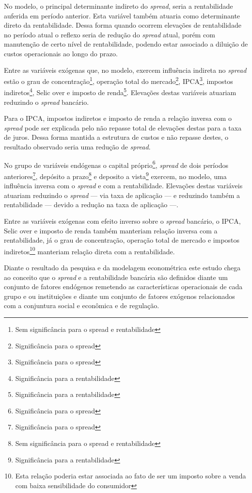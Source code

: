 \documentclass[
  12pt,
  12pt,
  openright,
  oneside,
  a4paper,
  chapter=TITLE,
  section=TITLE,
  subsection=TITLE,
  subsubsection=TITLE,
  english,
  portugues,
  sumario=tradicional]{abntex2}
\begin{document}
No modelo, o principal determinante indireto do \emph{spread}, seria a rentabilidade auferida em período anterior. Esta variável também atuaria como determinante direto da rentabilidade. Dessa forma quando ocorrem elevações de rentabilidade no período atual o reflexo seria de redução do \emph{spread} atual, porém com manutenção de certo nível de rentabilidade, podendo estar associado a diluição de custos operacionais ao longo do prazo.

Entre as variáveis exógenas que, no modelo, exercem influência indireta no \emph{spread} estão o grau de concentração\footnote{Sem significância para o spread e rentabilidade}, operação total do mercado\footnote{Significância para o spread}, IPCA\footnote{Significância para o spread}, impostos indiretos\footnote{Significância para a rentabilidade}, Selic over e imposto de renda\footnote{Significância para a rentabilidade}. Elevações destas variáveis atuariam reduzindo o \emph{spread} bancário.

Para o IPCA, impostos indiretos e imposto de renda a relação inversa com o \emph{spread} pode ser explicada pelo não repasse total de elevações destas para a taxa de juros. Dessa forma mantida a estrutura de custos e não repasse destes, o resultado observado seria uma redução de \emph{spread}.

No grupo de variáveis endógenas o capital próprio\footnote{Significância para o spread}, \emph{spread} de dois períodos anteriores\footnote{Significância para o spread}, depósito a prazo\footnote{Sem significância para o spread e rentabilidade} e deposito a vista\footnote{Significância para a rentabilidade} exercem, no modelo, uma influência inversa com o \emph{spread} e com a rentabilidade. Elevações destas variáveis atuariam reduzindo o \emph{spread} --- via taxa de aplicação --- e reduzindo também a rentabilidade --- devido a redução na taxa de aplicação ---.

Entre as variáveis exógenas com efeito inverso sobre o \emph{spread} bancário, o IPCA, Selic over e imposto de renda também manteriam relação inversa com a rentabilidade, já o grau de concentração, operação total de mercado e impostos indiretos\footnote{Esta relação poderia estar associada ao fato de ser um imposto sobre a venda com baixa sensibilidade do consumidor} manteriam relação direta com a rentabilidade.

Diante o resultado da pesquisa e da modelagem econométrica este estudo chega ao conceito que o \emph{spread} e a rentabilidade bancária são definidos diante um conjunto de fatores endógenos remetendo as características operacionais de cada grupo e ou instituições e diante um conjunto de fatores exógenos relacionados com a conjuntura social e econômica e de regulação.
\end{document}

